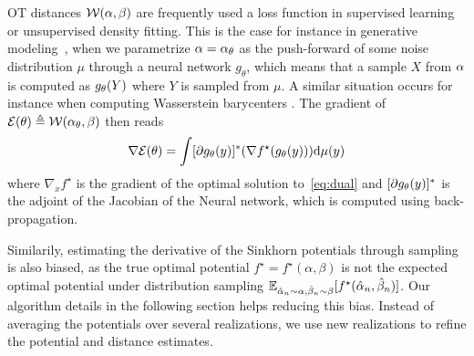 OT distances $\mathcal{W}(\alpha, \beta)$ are frequently used a loss function in supervised learning or unsupervised density fitting. 
This is the case for instance in generative modeling~\cite{arjovsky2017wgan}, when we parametrize $\alpha=\alpha_\theta$ as the push-forward of some noise distribution $\mu$ through a neural network $g_\theta$, which means that a sample $X$ from $\alpha$ is computed as $g_\theta(Y)$ where $Y$ is sampled from $\mu$. A similar situation occurs for instance when computing Wasserstein barycenters \cite{staib2017parallel}. 
%
The gradient of $\mathcal{E}(\theta) \triangleq \mathcal{W}(\alpha_\theta, \beta)$ then reads~\cite{peyre2019computational} 
\begin{equation}
	\nabla \mathcal{E}(\theta) = \int [\partial g_\theta(y)]^*( \nabla f^\star(g_\theta(y)) ) \textrm{d}\mu(y)
\end{equation}
where $\nabla_x f^\star$ is the gradient of the optimal solution to~\eqref{eq:dual} and $[\partial g_\theta(y)]^*$ is the adjoint of the Jacobian of the Neural network, which is computed using back-propagation.


Similarily, estimating the derivative of the Sinkhorn potentials through
sampling is also biased, as the true optimal potential $f^\star=f^\star(\alpha, \beta)$
is not the expected optimal potential under distribution sampling $\mathbb{E}_{\hat
\alpha_n \sim \alpha, \hat \beta_n \sim \beta}[f^\star(\hat \alpha_n, \hat
\beta_n)]$.  Our algorithm details in the following section helps reducing this bias. Instead of averaging the
potentials over several realizations, we use new realizations to refine the potential and distance estimates.